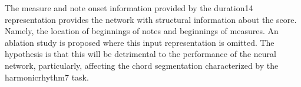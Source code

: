 
The measure and note onset information provided by the
\gls{duration14} representation provides the network with
structural information about the score. Namely, the location
of beginnings of notes and beginnings of measures. An
ablation study is proposed where this input representation
is omitted. The hypothesis is that this will be detrimental
to the performance of the neural network, particularly,
affecting the chord segmentation characterized by the
\gls{harmonicrhythm7} task.
